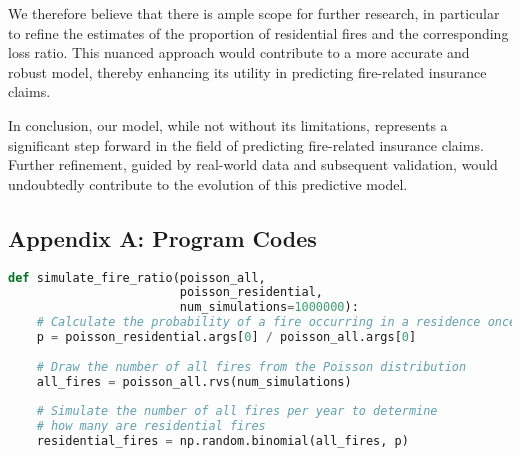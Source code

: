 \documentclass[12pt]{article}  %
\begin{document}
We therefore believe that there is ample scope for further research, in particular to refine the estimates of the proportion of residential fires and the corresponding loss ratio. This nuanced approach would contribute to a more accurate and robust model, thereby enhancing its utility in predicting fire-related insurance claims.

In conclusion, our model, while not without its limitations, represents a significant step forward in the field of predicting fire-related insurance claims. Further refinement, guided by real-world data and subsequent validation, would undoubtedly contribute to the evolution of this predictive model.

\clearpage



\begin{subappendices}  %





\section{Appendix A: Program Codes}


\begin{lstlisting}[language=Python, name={simulate_fire_ratio}]
def simulate_fire_ratio(poisson_all, 
                        poisson_residential, 
                        num_simulations=1000000):
    # Calculate the probability of a fire occurring in a residence once
    p = poisson_residential.args[0] / poisson_all.args[0]
    
    # Draw the number of all fires from the Poisson distribution
    all_fires = poisson_all.rvs(num_simulations)
    
    # Simulate the number of all fires per year to determine 
    # how many are residential fires
    residential_fires = np.random.binomial(all_fires, p)
    

\end{lstlisting}
\end{subappendices}
\end{document}
